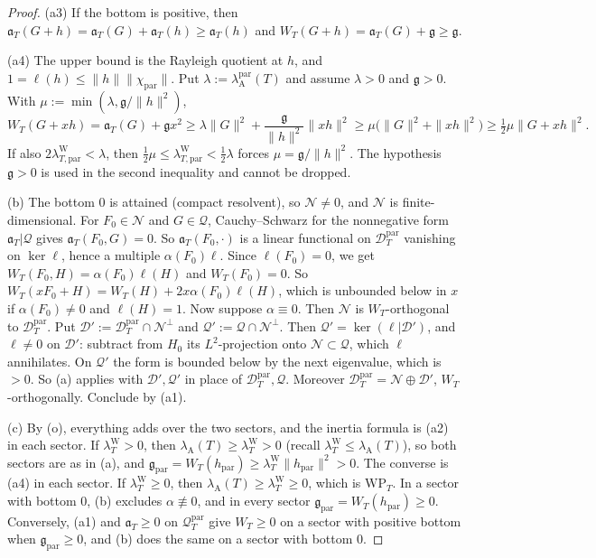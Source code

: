\documentclass[11pt]{amsart}
\theoremstyle{definition}
\theoremstyle{remark}
\newcommand{\lamW}{\lambda^{\mathrm W}_T}
\newcommand{\lamA}{\lambda_{\mathrm A}(T)}
\begin{document}
\begin{proof}
(a3) If the bottom is positive, then $\mathfrak a_T(G+h)=\mathfrak a_T(G)+\mathfrak a_T(h)\ge\mathfrak a_T(h)$ and
$W_T(G+h)=\mathfrak a_T(G)+\mathfrak g\ge\mathfrak g$.

(a4) The upper bound is the Rayleigh quotient at $h$, and $1=\ell(h)\le\|h\|\|\chi_{\mathrm{par}}\|$. Put
$\lambda:=\lambda^{\mathrm{par}}_{\mathrm A}(T)$ and assume $\lambda>0$ and $\mathfrak g>0$. With
$\mu:=\min(\lambda,\mathfrak g/\|h\|^2)$,
\[
W_T(G+xh)=\mathfrak a_T(G)+\mathfrak gx^2\ge\lambda\|G\|^2+\frac{\mathfrak g}{\|h\|^2}\|xh\|^2
\ge\mu\big(\|G\|^2+\|xh\|^2\big)\ge\tfrac12\mu\|G+xh\|^2 .
\]
If also $2\lambda^{\mathrm W}_{T,\mathrm{par}}<\lambda$, then $\frac12\mu\le\lambda^{\mathrm W}_{T,\mathrm{par}}<\frac12\lambda$ forces
$\mu=\mathfrak g/\|h\|^2$. The hypothesis $\mathfrak g>0$ is used in the second inequality and cannot be dropped.

(b) The bottom $0$ is attained (compact resolvent), so $\mathcal N\ne0$, and $\mathcal N$ is finite-dimensional. For
$F_0\in\mathcal N$ and $G\in\mathcal Q$, Cauchy--Schwarz for the nonnegative form $\mathfrak a_T|\mathcal Q$ gives
$\mathfrak a_T(F_0,G)=0$. So $\mathfrak a_T(F_0,\cdot)$ is a linear functional on $\mathcal D^{\mathrm{par}}_T$ vanishing on
$\ker\ell$, hence a multiple $\alpha(F_0)\ell$. Since $\ell(F_0)=0$, we get $W_T(F_0,H)=\alpha(F_0)\ell(H)$ and
$W_T(F_0)=0$. So $W_T(xF_0+H)=W_T(H)+2x\alpha(F_0)\ell(H)$, which is unbounded below in $x$ if
$\alpha(F_0)\ne0$ and $\ell(H)=1$. Now suppose $\alpha\equiv0$. Then $\mathcal N$ is $W_T$-orthogonal to
$\mathcal D^{\mathrm{par}}_T$. Put $\mathcal D':=\mathcal D^{\mathrm{par}}_T\cap\mathcal N^\perp$ and $\mathcal Q':=\mathcal Q\cap\mathcal N^\perp$.
Then $\mathcal Q'=\ker(\ell|\mathcal D')$, and $\ell\ne0$ on $\mathcal D'$: subtract from $H_0$ its $L^2$-projection onto
$\mathcal N\subset\mathcal Q$, which $\ell$ annihilates. On $\mathcal Q'$ the form is bounded below by the next eigenvalue,
which is $>0$. So (a) applies with $\mathcal D',\mathcal Q'$ in place of $\mathcal D^{\mathrm{par}}_T,\mathcal Q$. Moreover
$\mathcal D^{\mathrm{par}}_T=\mathcal N\oplus\mathcal D'$, $W_T$-orthogonally. Conclude by (a1).

(c) By (o), everything adds over the two sectors, and the inertia formula is (a2) in each sector. If
$\lamW>0$, then $\lamA\ge\lamW>0$ (recall $\lamW\le\lamA$), so both sectors are as in (a), and
$\mathfrak g_{\mathrm{par}}=W_T(h_{\mathrm{par}})\ge\lamW\|h_{\mathrm{par}}\|^2>0$. The converse is (a4) in each sector. If $\lamW\ge0$,
then $\lamA\ge\lamW\ge0$, which is $\mathrm{WP}_T$. In a sector with bottom $0$, (b) excludes $\alpha\not\equiv0$, and
in every sector $\mathfrak g_{\mathrm{par}}=W_T(h_{\mathrm{par}})\ge0$. Conversely, (a1) and $\mathfrak a_T\ge0$ on
$\mathcal Q^{\mathrm{par}}_T$ give $W_T\ge0$ on a sector with positive bottom when $\mathfrak g_{\mathrm{par}}\ge0$, and (b) does the
same on a sector with bottom $0$.
\end{proof}
\end{document}
